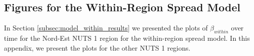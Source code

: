 \documentclass[12pt]{article}
\begin{document}
\begin{appendices}
		
    	
		
		
		\newpage
		\subsection{Figures for the Within-Region Spread Model} \label{sapp:figures_model_within}
		In Section \ref{subsec:model_within_results} we presented the plots of $\beta_{within}$ over time for the Nord-Est NUTS 1 region for the within-region spread model. In this appendix, we present the plots for the other NUTS 1 regions. \\
		

\end{appendices}
\end{document}

